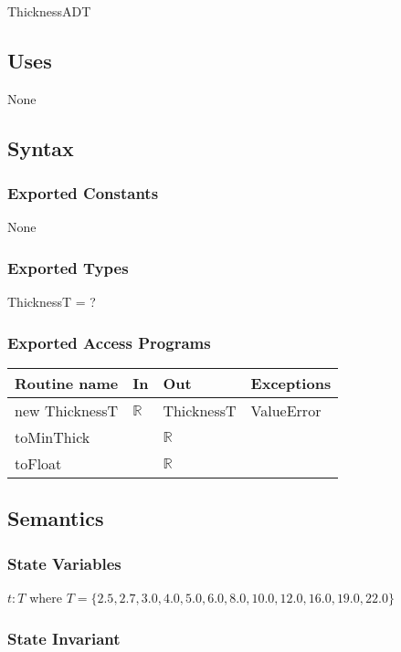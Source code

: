 \documentclass[12pt, titlepage]{article}
\begin{document}
ThicknessADT

\subsection {Uses}

None

\subsection {Syntax}

\subsubsection {Exported Constants}

None

\subsubsection {Exported Types}

ThicknessT = ?

\subsubsection {Exported Access Programs}

\begin{tabular}{| l | l | l | p{5cm} |}
\hline
\textbf{Routine name} & \textbf{In} & \textbf{Out} & \textbf{Exceptions}\\
\hline
new ThicknessT & $\mathbb{R}$ & ThicknessT & ValueError\\
\hline
toMinThick & ~ & $\mathbb{R}$ & ~\\
\hline
toFloat & ~ & $\mathbb{R}$ & ~\\
\hline
\end{tabular}

\subsection {Semantics}

\subsubsection {State Variables}

$t: T$ where $T = \{2.5, 2.7, 3.0, 4.0, 5.0, 6.0, 8.0, 10.0, 12.0, 16.0, 19.0, 22.0 \}$

\subsubsection {State Invariant}
\end{document}
